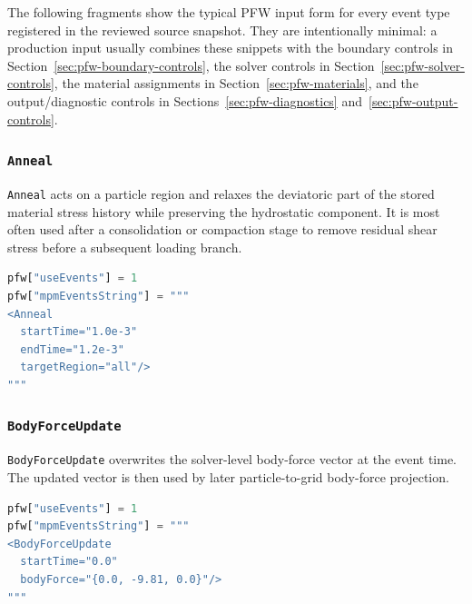 The following fragments show the typical PFW input form for every event type registered in the reviewed source snapshot.  They are intentionally minimal: a production input usually combines these snippets with the boundary controls in Section~\ref{sec:pfw-boundary-controls}, the solver controls in Section~\ref{sec:pfw-solver-controls}, the material assignments in Section~\ref{sec:pfw-materials}, and the output/diagnostic controls in Sections~\ref{sec:pfw-diagnostics} and~\ref{sec:pfw-output-controls}.

\subsubsection{\texttt{Anneal}}

\texttt{Anneal} acts on a particle region and relaxes the deviatoric part of the stored material stress history while preserving the hydrostatic component.  It is most often used after a consolidation or compaction stage to remove residual shear stress before a subsequent loading branch.

\begin{lstlisting}[language=Python,caption={Anneal event.}]
pfw["useEvents"] = 1
pfw["mpmEventsString"] = """
<Anneal
  startTime="1.0e-3"
  endTime="1.2e-3"
  targetRegion="all"/>
"""
\end{lstlisting}

\subsubsection{\texttt{BodyForceUpdate}}

\texttt{BodyForceUpdate} overwrites the solver-level body-force vector at the event time.  The updated vector is then used by later particle-to-grid body-force projection.

\begin{lstlisting}[language=Python,caption={Body-force update event.}]
pfw["useEvents"] = 1
pfw["mpmEventsString"] = """
<BodyForceUpdate
  startTime="0.0"
  bodyForce="{0.0, -9.81, 0.0}"/>
"""
\end{lstlisting}

\subsubsection{}

